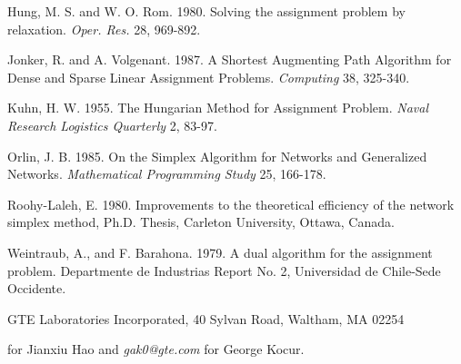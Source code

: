 \begin{thebibliography}{99}
Hung, M. S. and W. O. Rom. 1980. Solving the assignment problem by relaxation.
{\it Oper. Res.} 28, 969-892.

Jonker, R. and A. Volgenant. 1987. A Shortest Augmenting Path
Algorithm for Dense and Sparse Linear Assignment Problems.
{\it Computing} 38, 325-340.

Kuhn, H. W. 1955. The Hungarian Method for Assignment Problem. {\it Naval
Research Logistics Quarterly} 2, 83-97.

Orlin, J. B. 1985. On the Simplex Algorithm for Networks and
Generalized Networks. {\it Mathematical Programming Study} 25, 166-178.

Roohy-Laleh, E. 1980. Improvements to the theoretical efficiency of the
network simplex method, Ph.D. Thesis, Carleton University, Ottawa, Canada.

Weintraub, A., and F. Barahona. 1979. A dual algorithm for the
assignment problem. Departmente de Industrias Report No. 2, Universidad de
Chile-Sede Occidente.

\end{thebibliography}
\noindent GTE Laboratories Incorporated, 40 Sylvan Road, Waltham, MA 02254

 for Jianxiu Hao and 
{\it gak0@gte.com} for George Kocur.




